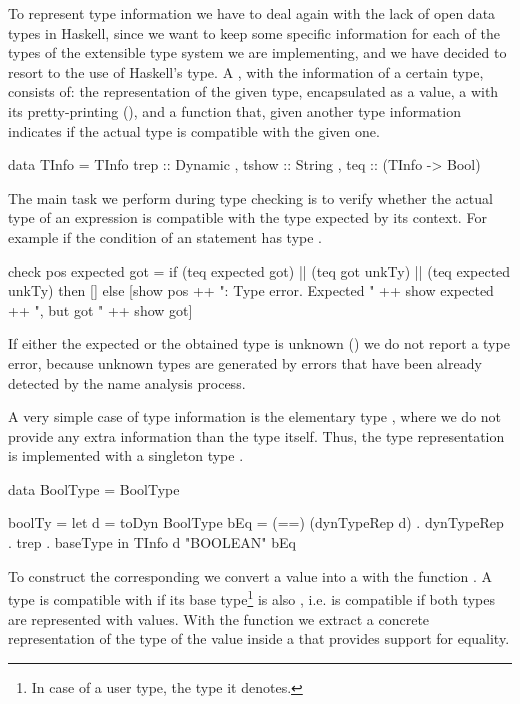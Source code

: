 To represent type information we have to deal again with the lack of open data types in Haskell,
since we want to keep some specific information for each of the types of the extensible type system we are implementing, and we have decided to resort to the use of Haskell's  type. 
A , with the information of a certain type, consists of:
the representation  of the given type, encapsulated as a  value, 
a  with its pretty-printing (), 
and a function  that, given another type information indicates if the actual type is compatible
with the given one.
\begin{haskell}
data TInfo = TInfo { trep  :: Dynamic
                   , tshow :: String 
                   , teq   :: (TInfo -> Bool) } 
\end{haskell}
The main task we perform during type checking is to verify whether the 
actual type of an expression is compatible with the type expected by its context.
For example if the condition of an  statement has type .
\begin{haskell}
check pos expected got 
  = if (teq expected got) || (teq got unkTy) || (teq expected unkTy)
    then []
    else [show pos ++ ": Type error. Expected " ++ show expected ++
          ", but got " ++ show got]  
\end{haskell}
If either the expected or the obtained type is unknown () 
we do not report a type error, because unknown types are generated by 
errors that have been already detected by the name analysis process.

A very simple case of type information is the elementary type ,
where we do not provide any extra information than the type itself.
Thus, the type representation is implemented with a singleton type .
\begin{haskell}
data BoolType = BoolType 

boolTy = let d   = toDyn BoolType
             bEq = (==) (dynTypeRep d) . dynTypeRep . trep . baseType   
         in  TInfo d "BOOLEAN" bEq	        
\end{haskell}
To construct the corresponding  we convert a  value 
into a  with the function .
A type is compatible with  if its base type\footnote{In case of a user type, the type it denotes.}
is also , i.e. is compatible if both types are represented with  values.
With the function  we extract a concrete representation of the type of the value inside a  
that provides support for equality.

